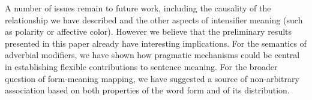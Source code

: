 \documentclass[10pt,letterpaper]{article}
\newcommand{\w}[1]{\emph{#1}}
\newcommand{\todo}[1]{{\color{red}#1}}
\begin{document}
A number of issues remain to future work, including the causality of the relationship we have described and the other aspects of intensifier meaning (such as polarity or affective color).
However we believe that the preliminary results presented in this paper already have interesting implications. 
For the semantics of adverbial modifiers, we have shown how pragmatic mechanisms could be central in establishing flexible contributions to sentence meaning.
For the broader question of form-meaning mapping, we have suggested a source of non-arbitrary association based on both properties of the word form and of its distribution.







\setlength{\bibleftmargin}{.125in}
\setlength{\bibindent}{-\bibleftmargin}


\end{document}
